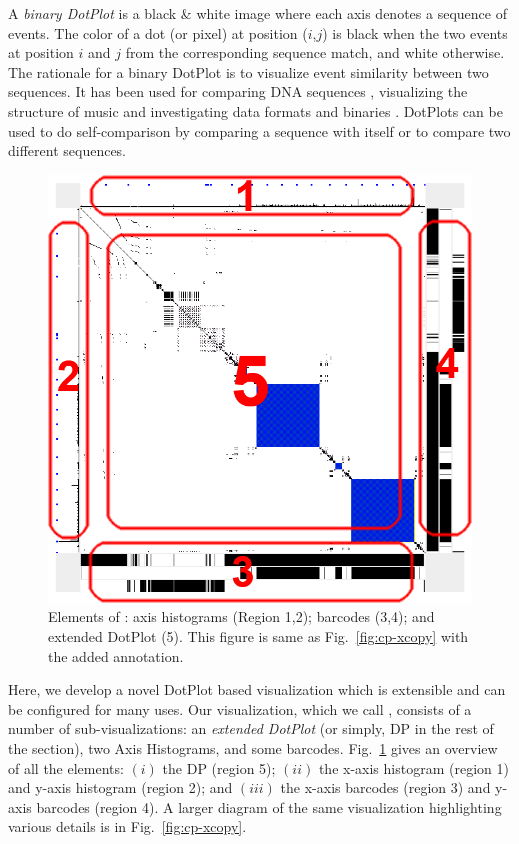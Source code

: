 
A {\em binary DotPlot} is a black \& white image
where each axis denotes a sequence of events.
The color of a dot (or pixel) at position ($i$,$j$) is black
when the two events at position $i$ and $j$ from the corresponding sequence
match, and white otherwise.
The rationale for a binary DotPlot is to visualize event similarity
between two sequences.
It has been used for comparing DNA sequences \cite{maizel1981enhanced},
visualizing the structure of music \cite{foote1999visualizing}
and investigating data formats and binaries \cite{kaminsky2006black}.
DotPlots can be used to do self-comparison
by comparing a sequence with itself or to compare
two different sequences.

\begin{figure}[tb]
\begin{center}
\includegraphics[width=0.5\columnwidth]{lviz/elements.png}
\caption{Elements of \VDP{}: axis histograms (Region 1,2);
barcodes (3,4); and extended DotPlot (5). This figure is same as
Fig.~\ref{fig:cp-xcopy} with the added annotation.}
\label{fig:elements}
\end{center}
\end{figure}

Here, we develop a novel DotPlot based visualization which is
extensible and can be configured for many uses.
Our visualization, which we call {\em \VDP{}},
consists of a number of sub-visualizations:
an {\em extended DotPlot} (or simply, DP in the rest of the section), two
Axis Histograms, and some barcodes.
Fig.~\ref{fig:elements} gives an overview of all the elements:
$(i)$ the DP (region 5);
$(ii)$ the x-axis histogram (region 1) and
y-axis histogram (region 2);
and $(iii)$ the x-axis barcodes (region 3) and
y-axis barcodes (region 4).
A larger diagram of the same visualization highlighting various
details is in Fig.~\ref{fig:cp-xcopy}.

